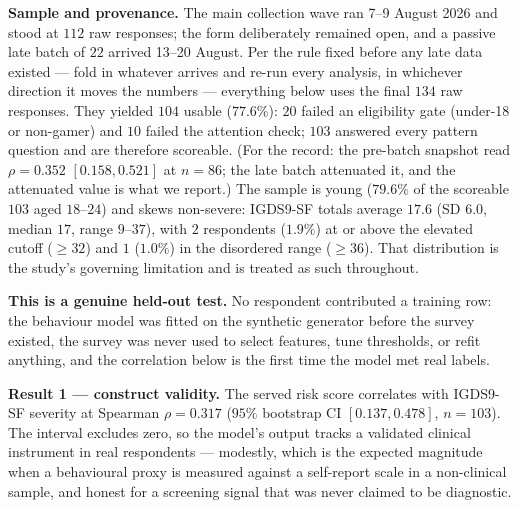 \documentclass[11pt,a4paper]{article}
\begin{document}
\textbf{Sample and provenance.} The main collection wave ran 7--9 August 2026
and stood at $112$ raw responses; the form deliberately remained open, and a
passive late batch of $22$ arrived 13--20 August. Per the rule fixed before any
late data existed --- fold in whatever arrives and re-run every analysis, in
whichever direction it moves the numbers --- everything below uses the final
$134$ raw responses. They yielded $104$ usable ($77.6\%$): $20$ failed an
eligibility gate (under-18 or non-gamer) and $10$ failed the attention check;
$103$ answered every pattern question and are therefore scoreable. (For the
record: the pre-batch snapshot read $\rho = 0.352$ $[0.158, 0.521]$ at
$n{=}86$; the late batch attenuated it, and the attenuated value is what we
report.) The sample is young ($79.6\%$ of the scoreable $103$ aged
$18$--$24$) and skews non-severe: IGDS9-SF totals average $17.6$ (SD $6.0$,
median $17$, range $9$--$37$), with $2$ respondents ($1.9\%$) at or above the
elevated cutoff ($\geq$$32$) and $1$ ($1.0\%$) in the disordered range
($\geq$$36$). That distribution is the study's governing
limitation and is treated as such throughout.

\textbf{This is a genuine held-out test.} No respondent contributed a training
row: the behaviour model was fitted on the synthetic generator before the survey
existed, the survey was never used to select features, tune thresholds, or refit
anything, and the correlation below is the first time the model met real labels.

\textbf{Result 1 --- construct validity.} The served risk score correlates with
IGDS9-SF severity at Spearman $\rho = \mathbf{0.317}$ ($95\%$ bootstrap CI
$[0.137, 0.478]$, $n{=}103$). The interval excludes zero, so the model's output
tracks a validated clinical instrument in real respondents --- modestly, which
is the expected magnitude when a behavioural proxy is measured against a
self-report scale in a non-clinical sample, and honest for a screening signal
that was never claimed to be diagnostic.
\end{document}
